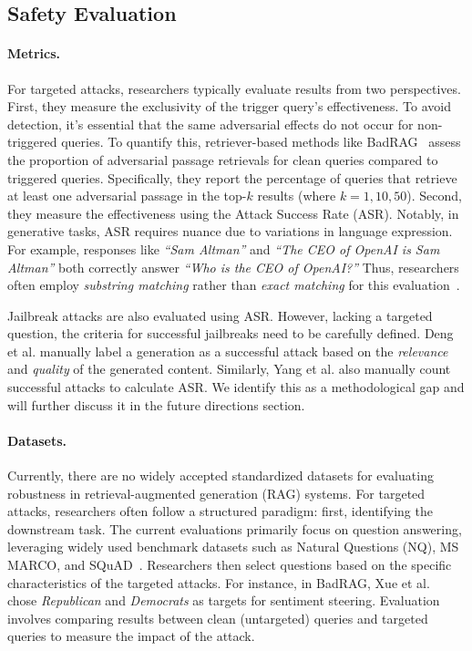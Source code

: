 \subsection{Safety Evaluation}
\paragraph{Metrics.} For targeted attacks, researchers typically evaluate results from two perspectives. First, they measure the exclusivity of the trigger query’s effectiveness. To avoid detection, it’s essential that the same adversarial effects do not occur for non-triggered queries. To quantify this, retriever-based methods like BadRAG~\cite{xue2024badrag} assess the proportion of adversarial passage retrievals for clean queries compared to triggered queries. Specifically, they report the percentage of queries that retrieve at least one adversarial passage in the top-$k$ results (where $k=1, 10, 50$). Second, they measure the effectiveness using the Attack Success Rate (ASR). Notably, in generative tasks, ASR requires nuance due to variations in language expression. For example, responses like \textit{“Sam Altman”} and \textit{“The CEO of OpenAI is Sam Altman”} both correctly answer \textit{“Who is the CEO of OpenAI?”} Thus, researchers often employ \textit{substring matching} rather than \textit{exact matching} for this evaluation~\cite{zou2024poisonedragknowledgecorruptionattacks}.

Jailbreak attacks are also evaluated using ASR. However, lacking a targeted question, the criteria for successful jailbreaks need to be carefully defined. Deng et al.\cite{deng2024pandorajailbreakgptsretrieval} manually label a generation as a successful attack based on the \textit{relevance} and \textit{quality} of the generated content. Similarly, Yang et al.\cite{wang2024poisonedlangchainjailbreakllms} also manually count successful attacks to calculate ASR. We identify this as a methodological gap and will further discuss it in the future directions section.

\paragraph{Datasets.}
Currently, there are no widely accepted standardized datasets for evaluating robustness in retrieval-augmented generation (RAG) systems. For targeted attacks, researchers often follow a structured paradigm: first, identifying the downstream task. The current evaluations primarily focus on question answering, leveraging widely used benchmark datasets such as Natural Questions (NQ)\cite{kwiatkowski-etal-2019-natural}, MS MARCO\cite{bajaj2018msmarcohumangenerated}, and SQuAD~\cite{rajpurkar2016squad}. Researchers then select questions based on the specific characteristics of the targeted attacks. For instance, in BadRAG, Xue et al.~\cite{xue2024badrag} chose \textit{Republican} and \textit{Democrats} as targets for sentiment steering. Evaluation involves comparing results between clean (untargeted) queries and targeted queries to measure the impact of the attack.

